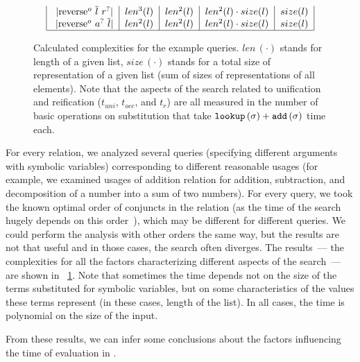 \begin{figure}[t]
\[\begin{tabular}{|c|c|c|c|c|}
           \lstinline|reverse$^o$ $\overline{l}$ $r^?$| & $len^3(l)$ & $len^2(l)$ & $len^2(l) \cdot size(l)$ & $size(l)$  \\
           \lstinline|reverse$^o$ $a^?$ $\overline{l}$| & $len^2(l)$ & $len^2(l)$ & $len^2(l) \cdot size(l)$ & $size(l)$  \\
           \hline
      \end{tabular} \]
      \caption{Calculated complexities for the example queries. $len\,(\cdot)$ stands for length of a given list, $size\,(\cdot)$ stands for a total size of representation of a given
        list (sum of sizes of representations of all elements). Note that the aspects of the search related to unification and reification ($t_{uni}$, $t_{occ}$, and $t_r$) are all measured
        in the number of basic operations on substitution that take $\texttt{lookup}\,(\sigma) + \texttt{add}\,(\sigma)$ time each.}
  \label{fig:examples_all_complexities}
\end{figure}

For every relation, we analyzed several queries (specifying different arguments with symbolic variables) corresponding to different reasonable usages (for example, we examined usages
of addition relation for addition, subtraction, and decomposition of a number into a sum of two numbers). For every query, we took the known optimal order of conjuncts in the relation
(as the time of the search hugely depends on this order~\cite{WillThesis}), which may be different for different queries. We could perform the analysis with other orders the same way,
but the results are not that useful and in those cases, the search often diverges. The results~--- the complexities for all the factors characterizing different aspects of the search~---
are shown in \figureword~\ref{fig:examples_all_complexities}. Note that sometimes the time depends not on the size of the terms substituted for symbolic variables, but on some
characteristics of the values these terms represent (in these cases, length of the list). In all cases, the time is polynomial on the size of the input.

From these results, we can infer some conclusions about the factors influencing the time of evaluation in \mK.


